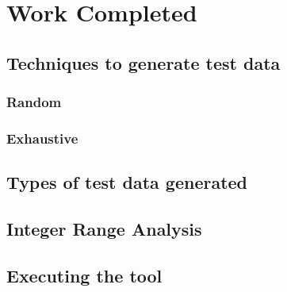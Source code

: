 \chapter{Work Completed}\label{chapter:work}


\section{Techniques to generate test data}

\subsection{Random}

\subsection{Exhaustive}

\section{Types of test data generated}

\section{Integer Range Analysis}

\section{Executing the tool}
